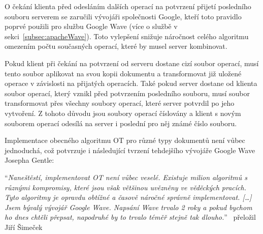 O čekání klienta před odesláním dalších operací na potvrzení přijetí posledního souboru serverem se zaručili vývojáři společnosti Google, kteří toto pravidlo poprvé použili pro službu Google Wave (více o službě v sekci~\ref{subsec:apacheWave}).
Toto vylepšení snižuje náročnost celého algoritmu omezením počtu současných operací, které by musel server kombinovat.~\cite{ot:waveAddition}

Pokud klient při čekání na potvrzení od serveru dostane cizí soubor operací, musí tento soubor aplikovat na svou kopii dokumentu a transformovat již uložené operace v závislosti na přijatých operacích.
Také pokud server dostane od klienta soubor operací, který vznikl před potvrzením posledního souboru, musí soubor transformovat přes všechny soubory operací, které server potvrdil po jeho vytvoření.
Z tohoto důvodu jsou soubory operací číslovány a klient s novým souborem operací odesílá na server i poslední pro něj známé číslo souboru.

Implementace obecného algoritmu \gls{OT} pro různé typy dokumentů není vůbec jednoduchá, což potvrzuje i následující tvrzení tehdejšího vývojáře Google Wave Josepha Gentle:

\enquote{\textit{Naneštěstí, implementovat OT není vůbec veselé.
Existuje milion algoritmů s různými kompromisy, které jsou však většinou uvězněny ve věděckých pracích.
Tyto algoritmy je opravdu obtížné a časově náročné správně implementovat.
[\ldots]
Jsem bývalý vývojář Google Wave.
Napsání Wave trvalo 2 roky a pokud bychom ho dnes chtěli přepsat, napodruhé by to trvalo téměř stejně tak dlouho.}}~\cite{ot:sharejs} přeložil Jiří Šimeček
